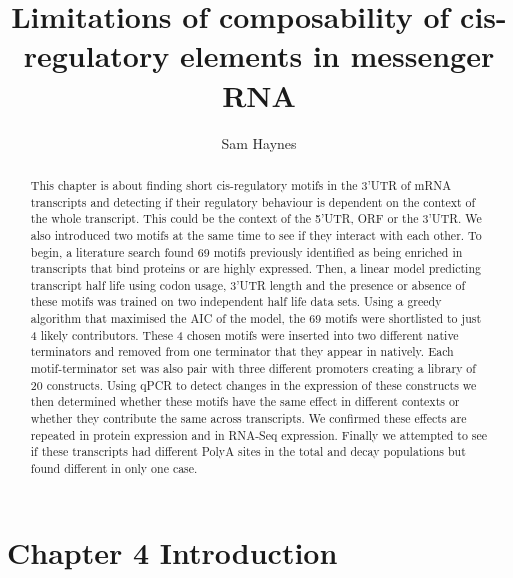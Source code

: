 \documentclass{SBCbookchapter}
\author{Sam Haynes}
\title{{Limitations} of composability of cis-regulatory elements in messenger RNA}
\begin{document}
\maketitle

\begin{abstract}
This chapter is about finding short cis-regulatory motifs in the 3'UTR of mRNA transcripts and detecting if their regulatory behaviour is dependent on the context of the whole transcript. This could be the context of the 5'UTR, ORF or the 3'UTR. We also introduced two motifs at the same time to see if they interact with each other. To begin, a literature search found 69 motifs previously identified as being enriched in transcripts that bind proteins or are highly expressed. Then, a linear model predicting transcript half life using codon usage, 3'UTR length and the presence or absence of these motifs was trained on two independent half life data sets. Using a greedy algorithm that maximised the AIC of the model, the 69 motifs were shortlisted to just 4 likely contributors. These 4 chosen motifs were inserted into two different native terminators and removed from one terminator that they appear in natively. Each motif-terminator set was also pair with three different promoters creating a library of 20 constructs. Using qPCR to detect changes in the expression of these constructs we then determined whether these motifs have the same effect in different contexts or whether they contribute the same across transcripts. We confirmed these effects are repeated in protein expression and in RNA-Seq expression. Finally we attempted to see if these transcripts had different PolyA sites in the total and decay populations but found different in only one case.
\end{abstract}

\section{Chapter 4 Introduction}
\end{document}

